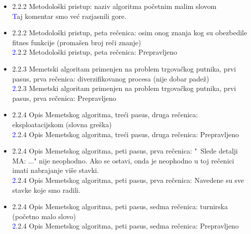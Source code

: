 \documentclass[a4paper]{report}
\newcommand{\odgovor}[1]{\textcolor{blue}{#1}}
\begin{document}
\begin{itemize}
    
    \item 2.2.2 Metodološki pristup: naziv algoritma početnim malim slovom\\
    \odgovor Taj komentar smo već razjasnili gore.
    
    \item 2.2.2 Metodološki pristup, peta rečenica: osim onog znanja kog su obezbedile fitnes funkcije (promašen broj reči znanje)\\
    \odgovor 2.2.2 Metodološki pristup, peta rečenica: Prepravljeno \\ 
    
    
    \item 2.2.3 Memetski algoritam primenjen na problem trgovačkog putnika, prvi pasus, prva rečenica: diverzifikovanog procesa (nije dobar padež)\\ 
     \odgovor 2.2.3 Memetski algoritam primenjen na problem trgovačkog putnika, prvi pasus, prva rečenica: Prepravljeno \\ 
    
    \item 2.2.4 Opis Memetskog algoritma, treći pasus, druga rečenica: eksploatacijskom (slovna greška)\\ 
    \odgovor  2.2.4 Opis Memetskog algoritma, treći pasus, druga rečenica:  Prepravljeno \\ 
    
    \item 2.2.4 Opis Memetskog algoritma, peti pasus, prva rečenica: "\ Slede detalji MA: ..." \hspace{0.075cm} nije neophodno. Ako se ostavi, onda je neophodno u toj rečenici imati nabrajanje više stavki. \\ 
    \odgovor 2.2.4 Opis Memetskog algoritma, peti pasus, prva rečenica: Navedene su sve stavke koje smo radili. \\ 
   
    
    
    \item 2.2.4 Opis Memetskog algoritma, peti pasus, sedma rečenica: turnirska (početno malo slovo) \\ 
     \odgovor 2.2.4 Opis Memetskog algoritma, peti pasus, sedma rečenica: Prepravljeno \\ 
     
     
    

\end{itemize}
\end{document}
